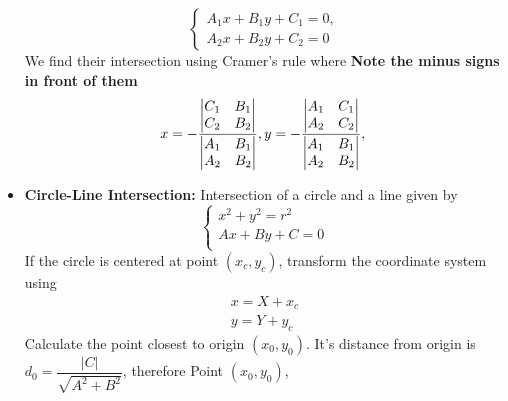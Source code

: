\documentclass[13pt,a4paper]{article}
\begin{document}
\begin{landscape}
\begin{multicols*}{3}
\begin{itemize}
\begin{equation*}
        \begin{cases*}
            A_1x + B_1y + C_1 = 0,\\
            A_2x + B_2y + C_2 = 0
        \end{cases*}
    \end{equation*}
    We find their intersection using Cramer's rule where \textbf{Note the minus signs in front of them}
    \begin{equation*}
        x = -\dfrac{\begin{vmatrix}
                C_1 & B_1\\
                C_2 & B_2\\
            \end{vmatrix}}{\begin{vmatrix}
                A_1 & B_1\\
                A_2 & B_2\\
            \end{vmatrix}},
        \\
        y = -\dfrac{\begin{vmatrix}
                A_1 & C_1\\
                A_2 & C_2\\
            \end{vmatrix}}{\begin{vmatrix}
                A_1 & B_1\\
                A_2 & B_2\\
            \end{vmatrix}},\\       
    \end{equation*}
    \item \textbf{Circle-Line Intersection:} Intersection of a circle and a line given by
        \begin{equation*}
            \begin{cases}
                x^2 + y^2 = r^2 \\
                Ax + By + C = 0 \\
            \end{cases}
        \end{equation*}
        If the circle is centered at point $(x_c, y_c)$, transform the coordinate system using
        \begin{gather*}
            x = X + x_c\\
            y = Y + y_c
        \end{gather*}
    Calculate the point closest to origin $(x_0, y_0)$. It's distance from origin is $d_0 = \dfrac{|C|}{\sqrt{A^2 + B^2}}$, therefore Point $(x_0, y_0)$,

\end{itemize}
\end{multicols*}
\end{landscape}
\end{document}
